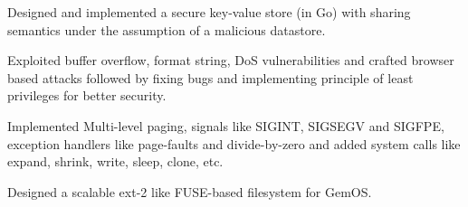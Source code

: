 \documentclass[a4paper]{deedy-resume-reversed}
\begin{document}
\begin{minipage}[t]{0.60\textwidth}
\begin{tightemize}
    \item Designed and implemented a secure key-value store (in Go) with sharing semantics under the assumption of a malicious datastore.
\end{tightemize}
\sectionsep

\descript{}
\begin{tightemize}
    \item Exploited buffer overflow, format string, DoS vulnerabilities and crafted browser based attacks followed by fixing bugs and implementing principle of least privileges for better security.
\end{tightemize}
\sectionsep

\begin{tightemize}
    \item Implemented Multi-level paging, signals like SIGINT, SIGSEGV and SIGFPE, exception handlers like page-faults and divide-by-zero and added system calls like expand, shrink, write, sleep, clone, etc.
    \item Designed a scalable ext-2 like FUSE-based filesystem for GemOS.
\end{tightemize}
\sectionsep




\end{minipage}
\end{document}
